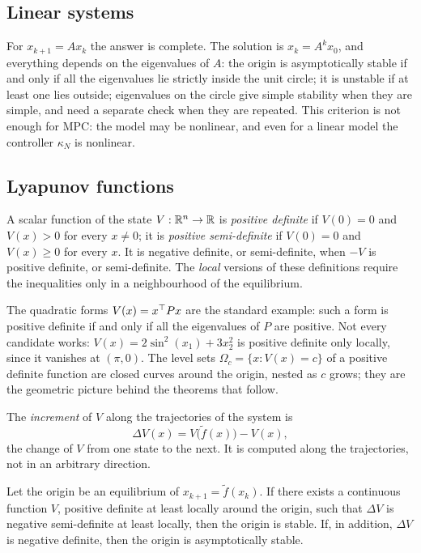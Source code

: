 \subsection{Linear systems}

For $x_{k+1} = A x_k$ the answer is complete. The solution is $x_k = A^k x_0$, and everything
depends on the eigenvalues of $A$: the origin is asymptotically stable if and only if all the
eigenvalues lie strictly inside the unit circle; it is unstable if at least one lies outside;
eigenvalues on the circle give simple stability when they are simple, and need a separate check
when they are repeated. This criterion is not enough for MPC: the model may be nonlinear, and
even for a linear model the controller $\kappa_N$ is nonlinear.

\subsection{Lyapunov functions}

\begin{definition}
A scalar function of the state $V: \mathbb{R}^n \to \mathbb{R}$ is \emph{positive definite} if $V(0) = 0$ and
$V(x) > 0$ for every $x \ne 0$; it is \emph{positive semi-definite} if $V(0) = 0$ and $V(x) \ge
0$ for every $x$. It is negative definite, or semi-definite, when $-V$ is positive definite, or
semi-definite. The \emph{local} versions of these definitions require the inequalities only in a
neighbourhood of the equilibrium.
\end{definition}

The quadratic forms $V(x) = x^{\top} P x$ are the standard example: such a form is positive definite
if and only if all the eigenvalues of $P$ are positive. Not every candidate works: $V(x) =
2\sin^2(x_1) + 3x_2^2$ is positive definite only locally, since it vanishes at $(\pi, 0)$. The level sets
$\Omega_c = \{x : V(x) = c\}$ of a positive definite function are closed curves around the
origin, nested as $c$ grows; they are the geometric picture behind the theorems that follow.

The \emph{increment} of $V$ along the trajectories of the system is
\begin{equation}
  \Delta V(x) = V\big(\tilde f(x)\big) - V(x),
\end{equation}
the change of $V$ from one state to the next. It is computed along the trajectories, not in an
arbitrary direction.

\begin{theorem}[Lyapunov]
Let the origin be an equilibrium of $x_{k+1} = \tilde f(x_k)$. If there exists a continuous
function $V$, positive definite at least locally around the origin, such that $\Delta V$ is negative
semi-definite at least locally, then the origin is stable. If, in addition, $\Delta V$ is
negative definite, then the origin is asymptotically stable.
\end{theorem}

